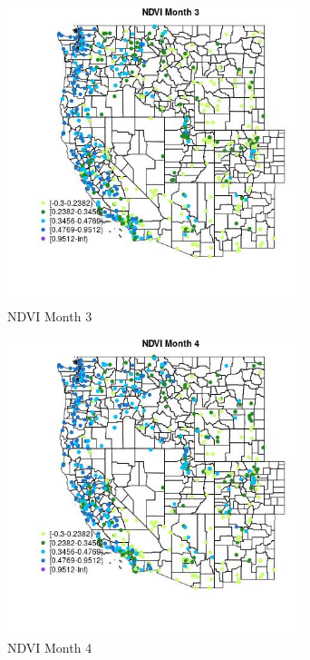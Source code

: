 \begin{figure} 
\centering  
\includegraphics[width=0.77\textwidth]{Code_Outputs/Report_ML_input_PM25_Step4_part_f_de_duplicated_aves_prioritize_24hr_obswNAs_MapObsMo3NDVI.jpg} 
\caption{\label{fig:Report_ML_input_PM25_Step4_part_f_de_duplicated_aves_prioritize_24hr_obswNAsMapObsMo3NDVI}NDVI Month 3} 
\end{figure} 
 

\begin{figure} 
\centering  
\includegraphics[width=0.77\textwidth]{Code_Outputs/Report_ML_input_PM25_Step4_part_f_de_duplicated_aves_prioritize_24hr_obswNAs_MapObsMo4NDVI.jpg} 
\caption{\label{fig:Report_ML_input_PM25_Step4_part_f_de_duplicated_aves_prioritize_24hr_obswNAsMapObsMo4NDVI}NDVI Month 4} 
\end{figure} 
 


